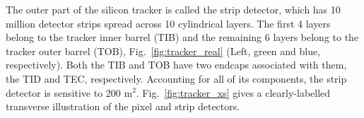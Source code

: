 The outer part of the silicon tracker is called the strip detector, which has 10 million detector strips spread across 10 cylindrical layers.
The first 4 layers belong to the tracker inner barrel (TIB) and the remaining 6 layers belong to the tracker outer barrel (TOB), Fig.~\ref{fig:tracker_real} (Left, green and blue, respectively). 
Both the TIB and TOB have two endcaps associated with them, the TID and TEC, respectively.
Accounting for all of its components, the strip detector is sensitive to 200 m$^2$.
Fig.~\ref{fig:tracker_xs} gives a clearly-labelled transverse illustration of the pixel and strip detectors.
